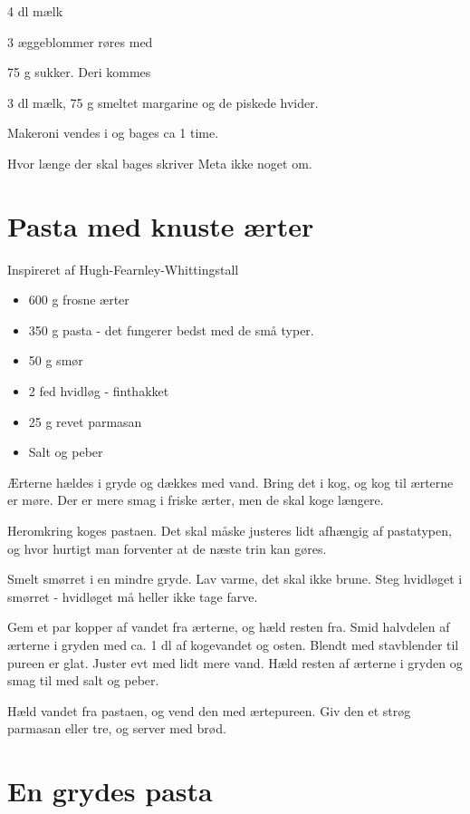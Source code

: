 \documentclass[
]{book}
\providecommand{\tightlist}{%
  \setlength{\itemsep}{0pt}\setlength{\parskip}{0pt}}
\begin{document}
4 dl mælk

3 æggeblommer røres med

75 g sukker. Deri kommes

3 dl mælk, 75 g smeltet margarine og de piskede hvider.

Makeroni vendes i og bages ca 1 time.

Hvor længe der skal bages skriver Meta ikke noget om.

\hypertarget{pasta-med-knuste-uxe6rter}{%
\section{Pasta med knuste ærter}\label{pasta-med-knuste-uxe6rter}}

Inspireret af Hugh-Fearnley-Whittingstall

\begin{itemize}
\tightlist
\item
  600 g frosne ærter
\item
  350 g pasta - det fungerer bedst med de små typer.
\item
  50 g smør
\item
  2 fed hvidløg - finthakket
\item
  25 g revet parmasan
\item
  Salt og peber
\end{itemize}

Ærterne hældes i gryde og dækkes med vand. Bring det i kog, og kog til ærterne er møre. Der er mere smag i friske ærter, men de skal koge længere.

Heromkring koges pastaen. Det skal måske justeres lidt afhængig af pastatypen, og hvor hurtigt man forventer at de næste trin kan gøres.

Smelt smørret i en mindre gryde. Lav varme, det skal ikke brune. Steg hvidløget i smørret - hvidløget må heller ikke tage farve.

Gem et par kopper af vandet fra ærterne, og hæld resten fra. Smid halvdelen af ærterne i gryden med ca. 1 dl af kogevandet og osten. Blendt med stavblender til pureen er glat. Juster evt med lidt mere vand. Hæld resten af ærterne i gryden og smag til med salt og peber.

Hæld vandet fra pastaen, og vend den med ærtepureen. Giv den et strøg parmasan eller tre, og server med brød.

\hypertarget{en-grydes-pasta}{%
\section{En grydes pasta}\label{en-grydes-pasta}}
\end{document}
